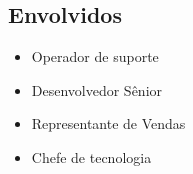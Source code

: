 \subsection{Envolvidos}
\begin{itemize}[noitemsep]
  \item Operador de suporte
  \item Desenvolvedor Sênior
  \item Representante de Vendas
  \item Chefe de tecnologia
\end{itemize}
